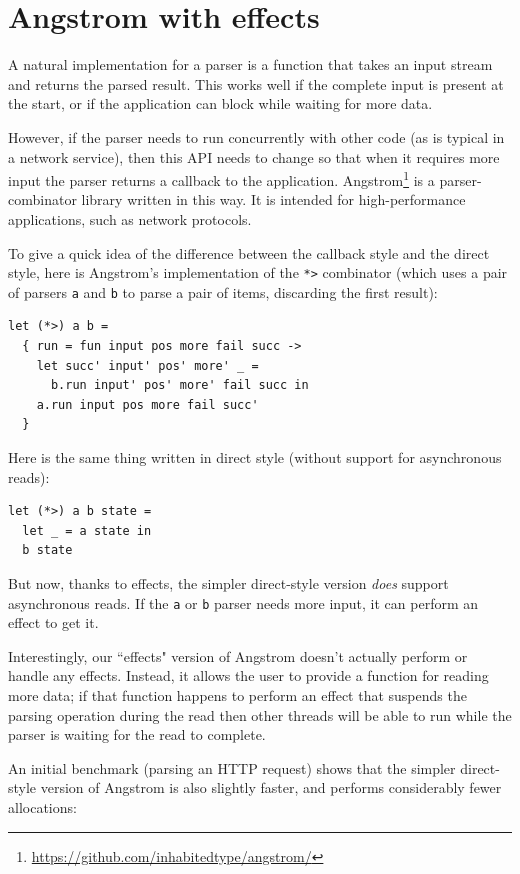 \documentclass[a4paper,twocolumn]{article}
\begin{document}
\section*{Angstrom with effects}

A natural implementation for a parser is a function that takes an input stream and returns the parsed result.
This works well if the complete input is present at the start, or if the application can block while waiting for more data.

However, if the parser needs to run concurrently with other code (as is typical in a network service), then this API needs to change so that when it requires more input the parser returns a callback to the application.
Angstrom\footnote{\url{https://github.com/inhabitedtype/angstrom/}} is a parser-combinator library written in this way.
It is intended for high-performance applications, such as network protocols.

To give a quick idea of the difference between the callback style and the direct style, here is Angstrom's implementation of the \verb|*>| combinator (which uses a pair of parsers \verb|a| and \verb|b| to parse a pair of items, discarding the first result):
\begin{lstlisting}[style=ocaml]
let (*>) a b =
  { run = fun input pos more fail succ ->
    let succ' input' pos' more' _ =
      b.run input' pos' more' fail succ in
    a.run input pos more fail succ'
  }
\end{lstlisting}

Here is the same thing written in direct style (without support for asynchronous reads):
\begin{lstlisting}[style=ocaml]
let (*>) a b state =
  let _ = a state in
  b state
\end{lstlisting}


But now, thanks to effects, the simpler direct-style version \emph{does} support asynchronous reads.
If the \verb|a| or \verb|b| parser needs more input, it can perform an effect to get it.

Interestingly, our ``effects" version of Angstrom doesn't actually perform or handle any effects.
Instead, it allows the user to provide a function for reading more data;
if that function happens to perform an effect that suspends the parsing operation during the read
then other threads will be able to run while the parser is waiting for the read to complete.

An initial benchmark (parsing an HTTP request) shows that the simpler direct-style version of Angstrom is also slightly faster, and performs considerably fewer allocations:
\end{document}
